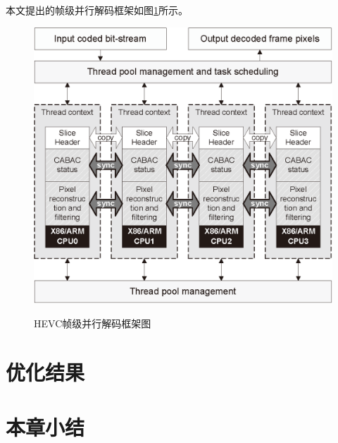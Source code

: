 本文提出的帧级并行解码框架如图\ref{fig:parallel_decoding_framework}所示。

\begin{figure}[!tp]
	\centering
	\includegraphics[width = 0.9\linewidth]{eps/parallel_decoding_framework}\\
	\caption{\label{fig:parallel_decoding_framework}HEVC帧级并行解码框架图}
\end{figure}

\section{优化结果}

\section{本章小结}









